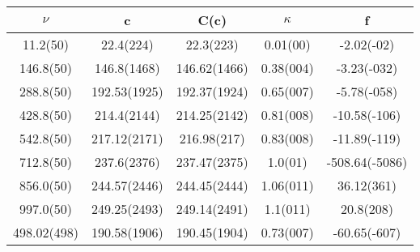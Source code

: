 \begin{table}[H]
	\centering
	\begin{tabular}{ccccc}
		$\nu$ & c & C(c) & $\kappa$ & f\\
		\hline
		11.2(50) & 22.4(224) & 22.3(223) & 0.01(00) & -2.02(-02)	\\
		146.8(50) & 146.8(1468) & 146.62(1466) & 0.38(004) & -3.23(-032)	\\
		288.8(50) & 192.53(1925) & 192.37(1924) & 0.65(007) & -5.78(-058)	\\
		428.8(50) & 214.4(2144) & 214.25(2142) & 0.81(008) & -10.58(-106)	\\
		542.8(50) & 217.12(2171) & 216.98(217) & 0.83(008) & -11.89(-119)	\\
		712.8(50) & 237.6(2376) & 237.47(2375) & 1.0(01) & -508.64(-5086)	\\
		856.0(50) & 244.57(2446) & 244.45(2444) & 1.06(011) & 36.12(361)	\\
		997.0(50) & 249.25(2493) & 249.14(2491) & 1.1(011) & 20.8(208)	\\
		498.02(498) & 190.58(1906) & 190.45(1904) & 0.73(007) & -60.65(-607)	\\
	\end{tabular}
\end{table}
